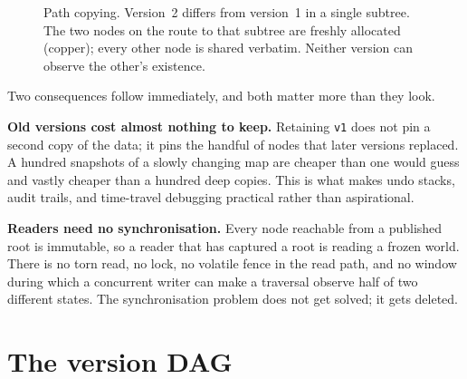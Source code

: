 \documentclass[11pt,twoside,openright]{book}
\newcommand{\code}[1]{\texorpdfstring{\textcolor{d7ink}{\texttt{#1}}}{#1}}
\begin{document}
\begin{figure}[htbp]
\centering
{}
\caption{Path copying. Version~2 differs from version~1 in a single subtree.
The two nodes on the route to that subtree are freshly allocated (copper); every
other node is shared verbatim. Neither version can observe the other's
existence.}
\label{fig:pathcopy}
\end{figure}

Two consequences follow immediately, and both matter more than they look.

\textbf{Old versions cost almost nothing to keep.} Retaining \code{v1} does not
pin a second copy of the data; it pins the handful of nodes that later versions
replaced. A hundred snapshots of a slowly changing map are cheaper than one
would guess and vastly cheaper than a hundred deep copies. This is what makes
undo stacks, audit trails, and time-travel debugging practical rather than
aspirational.

\textbf{Readers need no synchronisation.} Every node reachable from a published
root is immutable, so a reader that has captured a root is reading a frozen
world. There is no torn read, no lock, no volatile fence in the read path, and
no window during which a concurrent writer can make a traversal observe half of
two different states. The synchronisation problem does not get solved; it gets
deleted.

\section{The version DAG}
\end{document}
